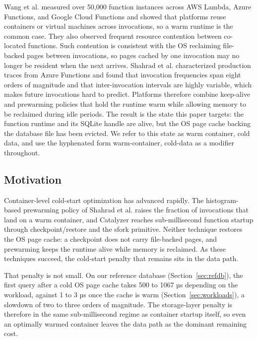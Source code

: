 \documentclass[sigconf, nonacm]{acmart}
\begin{document}
Wang et al. \cite{Wang2018} measured over 50,000 function instances across AWS Lambda, Azure Functions, and Google Cloud Functions and showed that platforms reuse containers or virtual machines across invocations, so a warm runtime is the common case. They also observed frequent resource contention between co-located functions. Such contention is consistent with the OS reclaiming file-backed pages between invocations, so pages cached by one invocation may no longer be resident when the next arrives. Shahrad et al. \cite{Shahrad2020} characterized production traces from Azure Functions and found that invocation frequencies span eight orders of magnitude and that inter-invocation intervals are highly variable, which makes future invocations hard to predict. Platforms therefore combine keep-alive and prewarming policies that hold the runtime warm while allowing memory to be reclaimed during idle periods. The result is the state this paper targets: the function runtime and its SQLite handle are alive, but the OS page cache backing the database file has been evicted. We refer to this state as warm container, cold data, and use the hyphenated form warm-container, cold-data as a modifier throughout.

\subsection{Motivation}\label{sec:motivation}

Container-level cold-start optimization has advanced rapidly. The histogram-based prewarming policy of Shahrad et al. \cite{Shahrad2020} raises the fraction of invocations that land on a warm container, and Catalyzer \cite{Du2020} reaches sub-millisecond function startup through checkpoint/restore and the sfork primitive. Neither technique restores the OS page cache: a checkpoint does not carry file-backed pages, and prewarming keeps the runtime alive while memory is reclaimed. As these techniques succeed, the cold-start penalty that remains sits in the data path.

That penalty is not small. On our reference database (Section~\ref{sec:refdb}), the first query after a cold OS page cache takes 500 to 1067 µs depending on the workload, against 1 to 3 µs once the cache is warm (Section~\ref{sec:workloads}), a slowdown of two to three orders of magnitude. The storage-layer penalty is therefore in the same sub-millisecond regime as container startup itself, so even an optimally warmed container leaves the data path as the dominant remaining cost.
\end{document}
